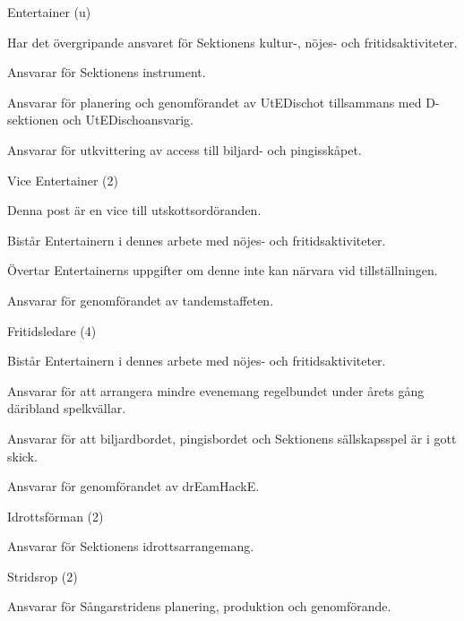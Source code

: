 \documentclass[10pt]{article}
\begin{document}
\begin{emptylist}
    \item Entertainer (u)
        \begin{dashlist}
          \item Har det övergripande ansvaret för Sektionens kultur-, nöjes- och fritidsaktiviteter.
          \item Ansvarar för Sektionens instrument.
          \item Ansvarar för planering och genomförandet av UtEDischot tillsammans med D-sektionen och UtEDischoansvarig.
          \item Ansvarar för utkvittering av access till biljard- och pingisskåpet.
        \end{dashlist}
    \item Vice Entertainer (2)
        \begin{dashlist}
            \item Denna post är en vice till utskottsordöranden.
          \item Bistår Entertainern i dennes arbete med nöjes- och fritidsaktiviteter.
          \item Övertar Entertainerns uppgifter om denne inte kan närvara vid tillställningen.
          \item Ansvarar för genomförandet av tandemstaffeten.
        \end{dashlist}
    \item Fritidsledare (4)
        \begin{dashlist}
            \item Bistår Entertainern i dennes arbete med nöjes- och fritidsaktiviteter.
            \item Ansvarar för att arrangera mindre evenemang regelbundet under årets gång däribland spelkvällar.
            \item Ansvarar för att biljardbordet, pingisbordet och Sektionens sällskapsspel är i gott skick.
	 \item Ansvarar för genomförandet av drEamHackE.
        \end{dashlist}
    \item Idrottsförman (2)
        \begin{dashlist}
            \item Ansvarar för Sektionens idrottsarrangemang.
        \end{dashlist}
    \item Stridsrop (2)
        \begin{dashlist}
            \item Ansvarar för Sångarstridens planering, produktion och genomförande.

\end{dashlist}
\end{emptylist}
\end{document}
